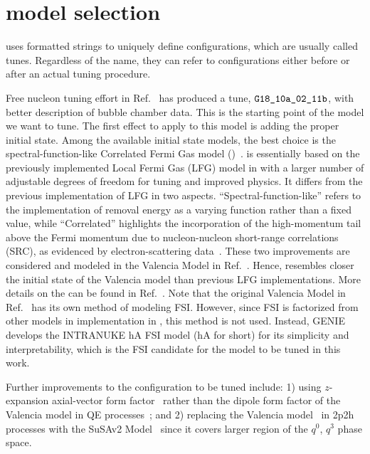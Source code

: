 \section{\genie model selection}\label{sec:genie}
\genie uses formatted strings to uniquely define configurations, which are usually called tunes. 
Regardless of the name, they can refer to configurations either before or after an actual tuning procedure. 

Free nucleon tuning effort in Ref.~\cite{GENIE:2021zuu} has produced a tune, $\texttt{G18\_10a\_02\_11b}$, with better description of bubble chamber data. 
This is the starting point of the model we want to tune. 
The first effect to apply to this model is adding the proper initial state. 
Among the available \genie initial state models, the best choice is the spectral-function-like Correlated Fermi Gas model (\sfcfg)~\cite{sfcfg-talk,sfcfg-GitHubCommit,GENIE:2021npt}. 
\sfcfg is essentially based on the previously implemented Local Fermi Gas (LFG) model in \genie with a larger number of adjustable degrees of freedom for tuning and improved physics. 
It differs from the previous implementation of LFG in two aspects. 
``Spectral-function-like'' refers to the implementation of removal energy as a varying function rather than a fixed value, while ``Correlated'' highlights the incorporation of the high-momentum tail above the Fermi momentum due to nucleon-nucleon short-range correlations (SRC), as evidenced by electron-scattering data~\cite{PhysRevLett.96.082501}.
These two improvements are considered and modeled in the Valencia Model in Ref.~\cite{Nieves:2004wx}.
Hence, \sfcfg resembles closer the initial state of the Valencia model than previous LFG implementations.
More details on the \sfcfg can be found in Ref.~\cite{GENIE:2021npt}. 
Note that the original Valencia Model in Ref.~\cite{Nieves:2004wx} has its own method of modeling FSI. 
However, since FSI is factorized from other models in implementation in \genie, this method is not used.
Instead, GENIE develops the INTRANUKE hA FSI model (hA for short) for its simplicity and interpretability, which is the FSI candidate for the model to be tuned in this work.

Further improvements to the configuration to be tuned include: 1) using $z$-expansion axial-vector form factor~\cite{Hill:2010yb} rather than the dipole form factor of the Valencia model in QE processes~\cite{Nieves:2004wx}; and 2) replacing the Valencia model~\cite{Nieves:2011pp} in 2p2h processes with the SuSAv2 Model~\cite{Gonzalez-Jimenez:2014eqa} since it covers larger region of the $q^0$, $q^3$ phase space.

